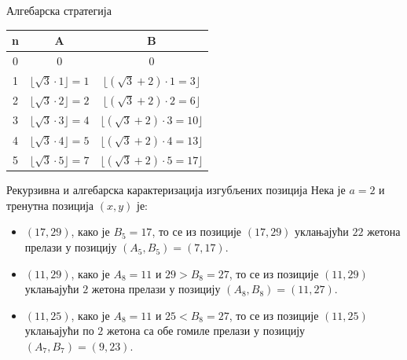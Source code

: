 \documentclass[10pt]{beamer}
\newcommand{\examplebox}[2]{
\begin{tcolorbox}[colframe=darkcardinal,colback=boxgray,title=#1]
#2
\end{tcolorbox}}
\DeclareMathOperator{\equal}{=}
\begin{document}
	\begin{frame}{Алгебарска стратегија}
		\examplebox{За $ a \equal 2 $ онда је $ \alpha \equal \sqrt{3} $ и $ \beta \equal \sqrt{3} + 2 $ и неке изгубљене позиције су:}{
			\begin{table}[h!]
				\begin{center}
					\begin{tabular}{  c | c | c }
						{\textbf{n}} &  {\textbf{A}} &  {\textbf{B}} \\
						\hline
						0 & 0 & 0 \\
						1 & $ \lfloor \sqrt{3} \cdot 1 \rfloor = 1 $ & $ \lfloor (\sqrt{3} + 2) \cdot 1 = 3 \rfloor $\\
						2 & $ \lfloor \sqrt{3} \cdot 2 \rfloor = 2 $ & $ \lfloor (\sqrt{3} + 2) \cdot 2 = 6 \rfloor $\\
						3 & $ \lfloor \sqrt{3} \cdot 3 \rfloor = 4 $ & $ \lfloor (\sqrt{3} + 2) \cdot 3 = 10 \rfloor $\\
						4 & $ \lfloor \sqrt{3} \cdot 4 \rfloor = 5 $ & $ \lfloor (\sqrt{3} + 2) \cdot 4 = 13 \rfloor $\\
						5 & $ \lfloor \sqrt{3} \cdot 5 \rfloor = 7 $ & $ \lfloor (\sqrt{3} + 2) \cdot 5 = 17 \rfloor $
					\end{tabular}
				\end{center}
		\end{table}}
	\end{frame}
	
	\begin{frame}{Рекурзивна и алгебарска карактеризација изгубљених позиција}
		Нека је $ a = 2 $ и тренутна позиција $ (x, y) $ је:
		\begin{itemize}
			\item $ (17, 29) $, како је $ B_{5} = 17 $, то се из позиције $ (17, 29) $ уклањајући $ 22 $ жетона прелази у позицију $ (A_{5}, B_{5}) = (7, 17) $. 
			\item $ (11, 29) $, како је $ A_{8} = 11 $ и $ 29 > B_{8} = 27 $, то се из позиције $ (11, 29) $ уклањајући $ 2 $ жетона прелази у позицију $ (A_{8}, B_{8}) = (11, 27) $.
			\item $ (11, 25) $, како је $ A_{8} = 11 $ и $ 25 < B_{8} = 27 $, то се из позиције $ (11, 25) $ уклањајући по $ 2 $ жетона са обе гомиле прелази у позицију $ (A_{7}, B_{7}) = (9, 23) $.
		\end{itemize}
	\end{frame}
	
\end{document}
